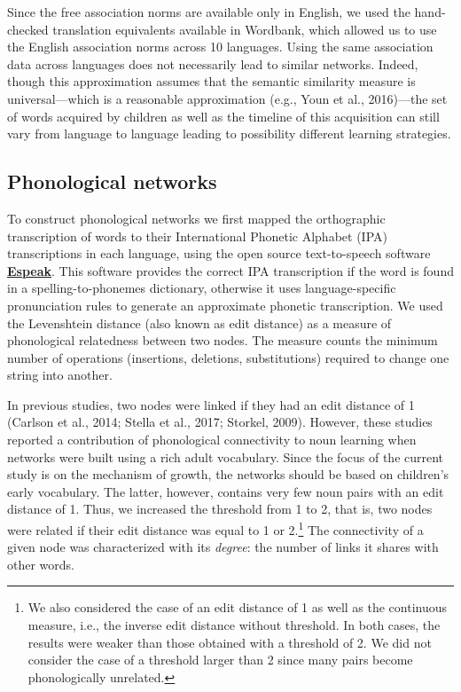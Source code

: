 \documentclass[english,floatsintext,man]{apa6}
\theoremstyle{definition}
\theoremstyle{definition}
\theoremstyle{definition}
\theoremstyle{remark}
\begin{document}
Since the free association norms are available only in English, we used
the hand-checked translation equivalents available in Wordbank, which
allowed us to use the English association norms across 10 languages.
Using the same association data across languages does not necessarily
lead to similar networks. Indeed, though this approximation assumes that
the semantic similarity measure is universal---which is a reasonable
approximation (e.g., Youn et al., 2016)---the set of words acquired by
children as well as the timeline of this acquisition can still vary from
language to language leading to possibility different learning
strategies.

\subsection{Phonological networks}\label{phonological-networks}

To construct phonological networks we first mapped the orthographic
transcription of words to their International Phonetic Alphabet (IPA)
transcriptions in each language, using the open source text-to-speech
software \textbf{\href{http://http://espeak.sourceforge.net/}{Espeak}}.
This software provides the correct IPA transcription if the word is
found in a spelling-to-phonemes dictionary, otherwise it uses
language-specific pronunciation rules to generate an approximate
phonetic transcription. We used the Levenshtein distance (also known as
edit distance) as a measure of phonological relatedness between two
nodes. The measure counts the minimum number of operations (insertions,
deletions, substitutions) required to change one string into another.

In previous studies, two nodes were linked if they had an edit distance
of 1 (Carlson et al., 2014; Stella et al., 2017; Storkel, 2009).
However, these studies reported a contribution of phonological
connectivity to noun learning when networks were built using a rich
adult vocabulary. Since the focus of the current study is on the
mechanism of growth, the networks should be based on children's early
vocabulary. The latter, however, contains very few noun pairs with an
edit distance of 1. Thus, we increased the threshold from 1 to 2, that
is, two nodes were related if their edit distance was equal to 1 or
2.\footnote{We also considered the case of an edit distance of 1 as well as the continuous measure, i.e., the inverse edit distance without threshold. In both cases, the results were weaker than those obtained with a threshold of 2. We did not consider the case of a threshold larger than 2 since many pairs become phonologically unrelated.}
The connectivity of a given node was characterized with its
\emph{degree}: the number of links it shares with other words.
\end{document}
